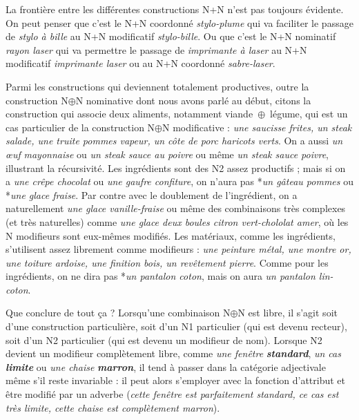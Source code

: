 {    La frontière entre les différentes constructions N+N n’est pas toujours évidente. On peut penser que c’est le N+N coordonné \textit{stylo-plume} qui va faciliter le passage de \textit{stylo à bille} au N+N modificatif \textit{stylo-bille}. Ou que c’est le N+N nominatif \textit{rayon laser} qui va permettre le passage de \textit{imprimante à laser} au N+N modificatif \textit{imprimante laser} ou au N+N coordonné \textit{sabre-laser}.

    Parmi les constructions qui deviennent totalement productives, outre la construction N\textrm{${\oplus}$}N nominative dont nous avons parlé au début, citons la construction qui associe deux aliments, notamment viande~\textrm{${\oplus}$}~légume, qui est un cas particulier de la construction N\textrm{${\oplus}$}N modificative : \textit{une saucisse frites, un steak salade, une truite pommes vapeur, un côte de porc haricots verts}. On a aussi \textit{un œuf} \textit{mayonnaise} ou \textit{un steak sauce au poivre} ou même \textit{un steak sauce poivre}, illustrant la récursivité. Les ingrédients sont des N2 assez productifs ; mais si on a \textit{une crêpe chocolat} ou \textit{une gaufre confiture}, on n’aura pas *\textit{un gâteau pommes} ou *\textit{une glace fraise}. Par contre avec le doublement de l’ingrédient, on a naturellement \textit{une glace vanille-fraise} ou même des combinaisons très complexes (et très naturelles) comme \textit{une glace deux boules citron vert-chololat amer}, où les N modifieurs sont eux-mêmes modifiés. Les matériaux, comme les ingrédients, s’utilisent assez librement comme modifieurs : \textit{une peinture métal, une montre or, une toiture ardoise, une finition bois, un revêtement pierre}. Comme pour les ingrédients, on ne dira pas *\textit{un pantalon coton}, mais on aura \textit{un pantalon lin-coton}.

    Que conclure de tout ça ? Lorsqu’une combinaison N\textrm{${\oplus}$}N est libre, il s’agit soit d’une construction particulière, soit d’un N1 particulier (qui est devenu recteur), soit d’un N2 particulier (qui est devenu un modifieur de nom). Lorsque N2 devient un modifieur complètement libre, comme \textit{une fenêtre} \textbf{\textit{standard}}, \textit{un cas} \textbf{\textit{limite}} ou \textit{une chaise} \textbf{\textit{marron}}, il tend à passer dans la catégorie adjectivale même s’il reste invariable : il peut alors s’employer avec la fonction d’attribut et être modifié par un adverbe (\textit{cette fenêtre est parfaitement standard, ce cas est très limite, cette chaise est complètement marron}).

}
